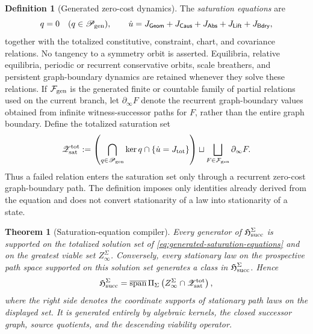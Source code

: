 \documentclass[11pt]{article}
\numberwithin{section}{part}
\theoremstyle{plain}
\newtheorem{theorem}{Theorem}[section]
\theoremstyle{definition}
\newtheorem{definition}[definition]{Definition}
\theoremstyle{remark}
\newcommand{\Geom}{\mathsf{Geom}}
\newcommand{\Caus}{\mathsf{Caus}}
\newcommand{\Abs}{\mathsf{Abs}}
\newcommand{\Lift}{\mathsf{Lift}}
\newcommand{\Bdry}{\mathsf{Bdry}}
\begin{document}
\begin{definition}[Generated zero-cost dynamics]
The \emph{saturation equations} are
\begin{equation}
 \label{eq:generated-saturation-equations}
 q=0\quad(q\in\mathscr P_{\rm gen}),
 \qquad
 \dot u=J_{\Geom}+J_{\Caus}+J_{\Abs}+J_{\Lift}+J_{\Bdry},
\end{equation}
together with the totalized constitutive, constraint, chart, and covariance
relations.  No tangency to a symmetry orbit is asserted.  Equilibria, relative
equilibria, periodic or recurrent conservative orbits, scale breathers, and
persistent graph-boundary dynamics are retained whenever they solve these
relations.  If
\(\mathcal F_{\rm gen}\) is the generated finite or countable family of
partial relations used on the current branch, let
\(\partial_\infty F\) denote the recurrent graph-boundary values obtained
from infinite witness-successor paths for \(F\), rather than the entire graph
boundary.  Define the totalized saturation set
\begin{equation}
 \label{eq:totalized-saturation-set}
 \mathscr Z_{\rm sat}^{\rm tot}
 :=
 \left(
  \bigcap_{q\in\mathscr P_{\rm gen}}\ker q
  \cap\{\dot u=J_{\rm tot}\}
 \right)
 \sqcup
 \bigsqcup_{F\in\mathcal F_{\rm gen}}\partial_\infty F .
\end{equation}
Thus a failed relation enters the saturation set only through a recurrent
zero-cost graph-boundary path.  The definition imposes only identities already
derived from the equation and does not convert stationarity of a law into
stationarity of a state.
\end{definition}

\begin{theorem}[Saturation-equation compiler]
\label{thm:saturation-equation-compiler}
Every generator of \(\mathfrak H_{\rm succ}^{\Sigma}\) is supported on the
totalized solution set of \eqref{eq:generated-saturation-equations} and on the
greatest viable set \(Z_\infty^\Sigma\).  Conversely, every stationary law on
the prospective path space supported on this solution set generates a class
in \(\mathfrak H_{\rm succ}^{\Sigma}\).  Hence
\begin{equation}
 \label{eq:saturation-algebra-kernel-form}
 \mathfrak H_{\rm succ}^{\Sigma}
 =
 \overline{\operatorname{span}}\,
 \Pi_\Sigma
 \left(
 Z_\infty^\Sigma
 \cap\mathscr Z_{\rm sat}^{\rm tot}
 \right),
\end{equation}
where the right side denotes the coordinate supports of stationary path laws
on the displayed set.  It is generated entirely by algebraic kernels, the
closed successor graph, source quotients, and the descending viability
operator.
\end{theorem}
\end{document}
